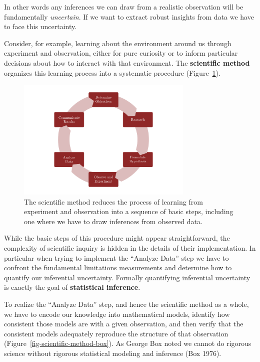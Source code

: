 \documentclass[
  letterpaper,
  DIV=11,
  numbers=noendperiod]{scrartcl}
\begin{document}
In other words any inferences we can draw from a realistic observation
will be fundamentally \emph{uncertain}. If we want to extract robust
insights from data we have to face this uncertainty.

Consider, for example, learning about the environment around us through
experiment and observation, either for pure curiosity or to inform
particular decisions about how to interact with that environment. The
\textbf{scientific method} organizes this learning process into a
systematic procedure (Figure~\ref{fig-scientific-method-nominal}).

\begin{figure}

{\centering \includegraphics[width=0.75\textwidth,height=\textheight]{figures/scientific_method/nominal/nominal.pdf}

}

\caption{\label{fig-scientific-method-nominal}The scientific method
reduces the process of learning from experiment and observation into a
sequence of basic steps, including one where we have to draw inferences
from observed data.}

\end{figure}

While the basic steps of this procedure might appear straightforward,
the complexity of scientific inquiry is hidden in the details of their
implementation. In particular when trying to implement the ``Analyze
Data'' step we have to confront the fundamental limitations measurements
and determine how to quantify our inferential uncertainty. Formally
quantifying inferential uncertainty is exactly the goal of
\textbf{statistical inference}.

To realize the ``Analyze Data'' step, and hence the scientific method as
a whole, we have to encode our knowledge into mathematical models,
identify how consistent those models are with a given observation, and
then verify that the consistent models adequately reproduce the
structure of that observation (Figure~\ref{fig-scientific-method-box}).
As George Box noted we cannot do rigorous science without rigorous
statistical modeling and inference (Box 1976).
\end{document}
